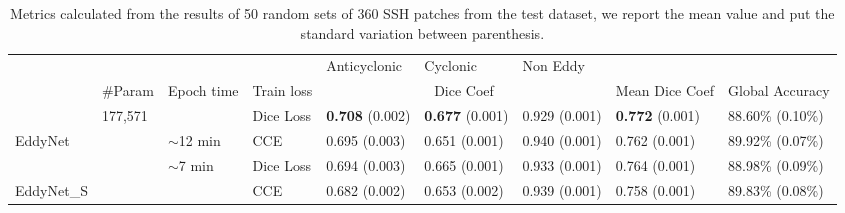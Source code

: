\documentclass[journal]{IEEEtran}
\begin{document}
\begin{table*}[t]
\centering
\caption{Metrics calculated from the results of 50 random sets of 360 SSH patches from the test dataset, we report the mean value and put the standard variation between parenthesis.}
\label{tab:eddynet_results}
\begin{tabular}{llll|l|l|l|ll}
\cline{5-7}
                                                        &                                         &                                         &                                        & Anticyclonic             & Cyclonic                 & Non Eddy                 &                                               &                                               \\ \cline{2-9} 
\multicolumn{1}{l|}{}                                   & \multicolumn{1}{l|}{\#Param}       & \multicolumn{1}{l|}{Epoch time}     & Train loss                          & \multicolumn{3}{c|}{Dice Coef}                                                & \multicolumn{1}{l|}{Mean Dice Coef}          & \multicolumn{1}{l|}{Global Accuracy}          \\ \hline
\multicolumn{1}{|l|}{}                                  & \multicolumn{1}{l|}{177,571}                   & \multicolumn{1}{l|}{}                   & \cellcolor[HTML]{FFCE93}Dice Loss      & \cellcolor[HTML]{FFCE93}\textbf{0.708} (0.002) & \cellcolor[HTML]{FFCE93}\textbf{0.677} (0.001) & \cellcolor[HTML]{FFCE93}0.929 (0.001) & \multicolumn{1}{l|}{\cellcolor[HTML]{FFCE93}\textbf{0.772 }(0.001)} & \multicolumn{1}{l|}{\cellcolor[HTML]{FFCE93}88.60\% (0.10\%)} \\ \cline{4-9} 
\multicolumn{1}{|l|}{\multirow{-2}{*}{EddyNet}} & \multicolumn{1}{l|}{}                   & \multicolumn{1}{l|}{\multirow{-2}{*}{$\sim$12 min}} & \cellcolor[HTML]{FFFFC7}CCE & \cellcolor[HTML]{FFFFC7}0.695 (0.003) & \cellcolor[HTML]{FFFFC7}0.651 (0.001) & \cellcolor[HTML]{FFFFC7}0.940 (0.001) & \multicolumn{1}{l|}{\cellcolor[HTML]{FFFFC7}0.762 (0.001)} & \multicolumn{1}{l|}{\cellcolor[HTML]{FFFFC7}89.92\% (0.07\%)} \\ \cline{1-1} \cline{3-9} 
\multicolumn{1}{|l|}{}                                  & \multicolumn{1}{l|}{}                   & \multicolumn{1}{l|}{$\sim$7 min}                   & \cellcolor[HTML]{FFCE93}Dice Loss      & \cellcolor[HTML]{FFCE93}0.694 (0.003) & \cellcolor[HTML]{FFCE93}0.665 (0.001) & \cellcolor[HTML]{FFCE93}0.933 (0.001) & \multicolumn{1}{l|}{\cellcolor[HTML]{FFCE93}0.764 (0.001)} & \multicolumn{1}{l|}{\cellcolor[HTML]{FFCE93}88.98\% (0.09\%)} \\ \cline{4-9} 
\multicolumn{1}{|l|}{\multirow{-2}{*}{EddyNet\_S}}    & \multicolumn{1}{l|}{\multirow{-4}{*}{}} & \multicolumn{1}{l|}{\multirow{-2}{*}{}} & \cellcolor[HTML]{FFFFC7}CCE & \cellcolor[HTML]{FFFFC7}0.682 (0.002) & \cellcolor[HTML]{FFFFC7}0.653 (0.002) & \cellcolor[HTML]{FFFFC7}0.939 (0.001) & \multicolumn{1}{l|}{\cellcolor[HTML]{FFFFC7}0.758 (0.001)} & \multicolumn{1}{l|}{\cellcolor[HTML]{FFFFC7}89.83\% (0.08\%)} \\ \hline
\end{tabular}
\end{table*}
\end{document}
